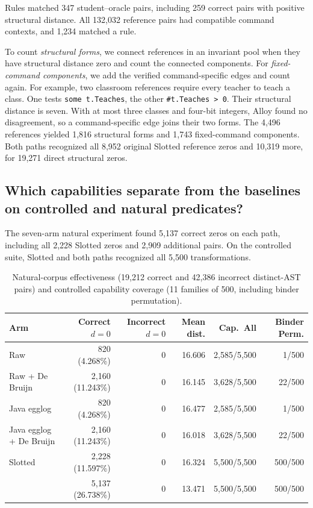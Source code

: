 Rules matched 347 student--oracle pairs, including 259 correct pairs with
positive structural distance. All 132,032 reference pairs had compatible
command contexts, and 1,234 matched a rule.

To count \emph{structural forms}, we connect references in an invariant pool
when they have structural distance zero and count the connected components.
For \emph{fixed-command components}, we add the verified command-specific
edges and count again. For example, two classroom references require every
teacher to teach a class. One tests \texttt{some t.Teaches}, the other
\texttt{\#t.Teaches > 0}. Their structural distance is seven. With at most
three classes and four-bit integers, Alloy found no disagreement, so a
command-specific edge joins their two forms. The 4,496 references yielded
1,816 structural forms and 1,743 fixed-command components. Both paths recognized
all 8,952 original Slotted reference zeros and 10,319 more,
for 19,271 direct structural zeros.



\subsection{Which capabilities separate \CanDis{} from the baselines on controlled and natural predicates?}
\label{sec:eval-capability}

The seven-arm natural experiment found 5,137 correct zeros on each
\CanDis{} path, including all 2,228 Slotted zeros and 2,909
additional pairs. On the controlled suite, Slotted and both \CanDis{}
paths recognized all 5,500 transformations.

\begin{table}[t]
\centering
\caption{Natural-corpus effectiveness (19,212 correct and 42,386
incorrect distinct-AST pairs) and controlled capability coverage
(11 families of 500, including binder permutation).}

\label{tab:eval-effectiveness}
\scriptsize
\setlength{\tabcolsep}{2.7pt}
\begin{tabular}{@{}lrrrrr@{}}
\toprule
Arm & Correct $d=0$ & Incorrect $d=0$ & Mean dist. & Cap.\ All & Binder Perm.\\
\midrule
Raw & 820 (4.268\%) & 0 & 16.606 & 2,585/5,500 & 1/500\\
Raw + De Bruijn & 2,160 (11.243\%) & 0 & 16.145 & 3,628/5,500 & 22/500\\
Java egglog & 820 (4.268\%) & 0 & 16.477 & 2,585/5,500 & 1/500\\
Java egglog + De Bruijn & 2,160 (11.243\%) & 0 & 16.018 & 3,628/5,500 & 22/500\\
Slotted & 2,228 (11.597\%) & 0 & 16.324 & 5,500/5,500 & 500/500\\
\CanDis{} & 5,137 (26.738\%) & 0 & 13.471 & 5,500/5,500 & 500/500\\

\bottomrule
\end{tabular}
\end{table}

